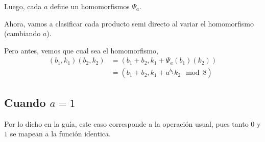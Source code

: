 \documentclass{article}
\begin{document}
    Luego, cada $a$ define un homomorfismos $\Psi_a$.

    Ahora, vamos a clasificar cada producto semi directo al variar el homomorfismo (cambiando $a$).

    Pero antes, vemos que cual sea el homomorfismo, 
    \[
      \begin{aligned}
        (b_1, k_1) (b_2, k_2) &= (b_1 + b_2, k_1 + \Psi_a(b_1)(k_2)) \\
        &= (b_1 + b_2, k_1 + a^{b_1}k_2 \mod 8)
      \end{aligned}
    \]

    \subsection{Cuando $a = 1$}
      Por lo dicho en la guía, este caso corresponde a la operación usual, pues tanto 
      $0$ y $1$ se mapean a la función identica.
\end{document}
